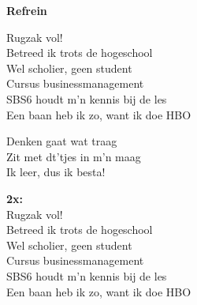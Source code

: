 \textbf{Refrein}

Rugzak vol!\\
Betreed ik trots de hogeschool\\
Wel scholier, geen student\\
Cursus businessmanagement\\
SBS6 houdt m'n kennis bij de les\\
Een baan heb ik zo, want ik doe HBO

Denken gaat wat traag\\
Zit met dt'tjes in m'n maag\\
Ik leer, dus ik besta!

\textbf{2x:}\\
Rugzak vol!\\
Betreed ik trots de hogeschool\\
Wel scholier, geen student\\
Cursus businessmanagement\\
SBS6 houdt m'n kennis bij de les\\
Een baan heb ik zo, want ik doe HBO
